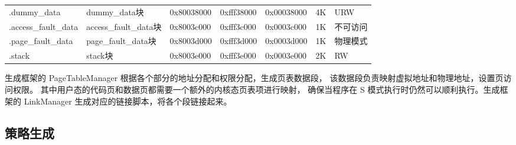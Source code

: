 \begin{table}[h!]
\begin{center}
{\begin{tabular}{|l|l|l|l|l|l|l|}
            .dummy\_data &   dummy\_data块&   0x80038000  &   0xfff38000      &   0x00038000      &   4K  &   URW              \\
            .access\_fault\_data  &   access\_fault\_data块 &   0x8003c000  &   0xfff3c000  &   0x0003c000  &   1K  &   不可访问 \\
            .page\_fault\_data    &   page\_fault\_data块   &   0x8003d000  &   0xfff3d000  &   0x0003d000  &   1K  &   物理模式 \\
            .stack      &   stack块     &   0x8003e000  &   0xfff3e000  &   0x0003e000  &   2K  &  RW \\
            \hline
        \end{tabular}
    }
    \end{center}
\end{table}

\begin{table}[h!]
    \begin{center} 
    \caption{group的.swap\_text包含的代码块} 
    \label{table:group-dist}  
    \end{center}
\end{table}

生成框架的 PageTableManager 根据各个部分的地址分配和权限分配，生成页表数据段，
该数据段负责映射虚拟地址和物理地址，设置页访问权限。
其中用户态的代码页和数据页都需要一个额外的内核态页表项进行映射，
确保当程序在 S 模式执行时仍然可以顺利执行。生成框架的 LinkManager 生成对应的链接脚本，将各个段链接起来。\par

\subsection{策略生成}

